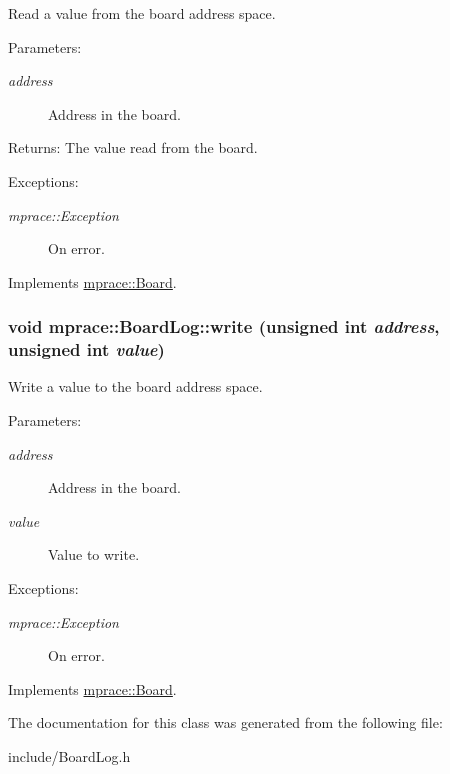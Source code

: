 Read a value from the board address space. 

\begin{Desc}
\item[Parameters:]
\begin{description}
\item[{\em address}]Address in the board. \end{description}
\end{Desc}
\begin{Desc}
\item[Returns:]The value read from the board. \end{Desc}
\begin{Desc}
\item[Exceptions:]
\begin{description}
\item[{\em mprace::Exception}]On error.\end{description}
\end{Desc}


Implements \hyperlink{classmprace_1_1Board_a2}{mprace::Board}.\hypertarget{classmprace_1_1BoardLog_a2}{
\subsubsection[write]{\setlength{\rightskip}{0pt plus 5cm}void mprace::Board\-Log::write (unsigned int {\em address}, unsigned int {\em value})}}
\label{classmprace_1_1BoardLog_a2}


Write a value to the board address space. 

\begin{Desc}
\item[Parameters:]
\begin{description}
\item[{\em address}]Address in the board. \item[{\em value}]Value to write. \end{description}
\end{Desc}
\begin{Desc}
\item[Exceptions:]
\begin{description}
\item[{\em mprace::Exception}]On error.\end{description}
\end{Desc}


Implements \hyperlink{classmprace_1_1Board_a1}{mprace::Board}.

The documentation for this class was generated from the following file:\begin{CompactItemize}
\item 
include/Board\-Log.h\end{CompactItemize}
